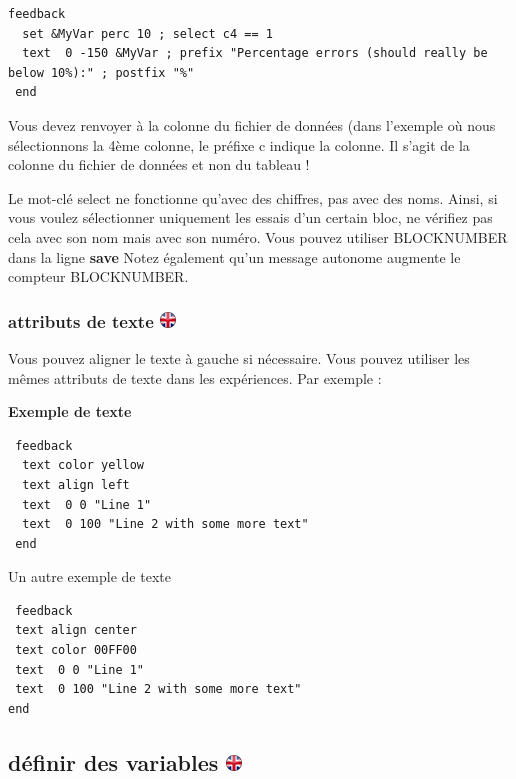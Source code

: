 \documentclass[
]{book}
\begin{document}
\begin{verbatim}
feedback
  set &MyVar perc 10 ; select c4 == 1
  text  0 -150 &MyVar ; prefix "Percentage errors (should really be below 10%):" ; postfix "%"
 end
\end{verbatim}

Vous devez renvoyer à la colonne du fichier de données (dans l'exemple où nous sélectionnons la 4ème colonne, le préfixe c indique la colonne. Il s'agit de la colonne du fichier de données et non du tableau !

Le mot-clé select ne fonctionne qu'avec des chiffres, pas avec des noms. Ainsi, si vous voulez sélectionner uniquement les essais d'un certain bloc, ne vérifiez pas cela avec son nom mais avec son numéro. Vous pouvez utiliser BLOCKNUMBER dans la ligne \textbf{save} Notez également qu'un message autonome augmente le compteur BLOCKNUMBER.

\hypertarget{attributs-de-texte}{%
\subsubsection[attributs de texte ]{\texorpdfstring{attributs de texte \href{https://www.psytoolkit.org/doc3.1.0/feedback.html\#_text_attributes}{\protect\includegraphics{img/ukflag.png}}}{attributs de texte }}\label{attributs-de-texte}}

Vous pouvez aligner le texte à gauche si nécessaire. Vous pouvez utiliser les mêmes attributs de texte dans les expériences. Par exemple :

\textbf{Exemple de texte}

\begin{verbatim}
 feedback
  text color yellow
  text align left
  text  0 0 "Line 1"
  text  0 100 "Line 2 with some more text"
 end
\end{verbatim}

Un autre exemple de texte

\begin{verbatim}
 feedback
 text align center
 text color 00FF00
 text  0 0 "Line 1"
 text  0 100 "Line 2 with some more text"
end
\end{verbatim}

\hypertarget{duxe9finir-des-variables}{%
\subsection[définir des variables ]{\texorpdfstring{définir des variables \href{https://www.psytoolkit.org/doc3.1.0/feedback.html\#_set}{\protect\includegraphics{img/ukflag.png}}}{définir des variables }}\label{duxe9finir-des-variables}}
\end{document}

